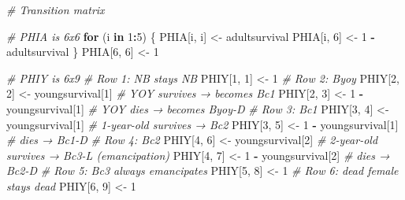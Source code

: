 \documentclass[
  12pt,
]{krantz}
\newenvironment{Shaded}{\begin{snugshade}}{\end{snugshade}}
\newcommand{\CommentTok}[1]{\textcolor[rgb]{0.56,0.35,0.01}{\textit{#1}}}
\newcommand{\ControlFlowTok}[1]{\textcolor[rgb]{0.13,0.29,0.53}{\textbf{#1}}}
\newcommand{\DecValTok}[1]{\textcolor[rgb]{0.00,0.00,0.81}{#1}}
\newcommand{\NormalTok}[1]{#1}
\newcommand{\OtherTok}[1]{\textcolor[rgb]{0.56,0.35,0.01}{#1}}
\newcommand{\SpecialCharTok}[1]{\textcolor[rgb]{0.81,0.36,0.00}{\textbf{#1}}}
\begin{document}
\begin{Shaded}
\begin{Highlighting}[]
\CommentTok{\# Transition matrix}

\CommentTok{\# PHIA is 6x6}
\ControlFlowTok{for}\NormalTok{ (i }\ControlFlowTok{in} \DecValTok{1}\SpecialCharTok{:}\DecValTok{5}\NormalTok{) \{}
\NormalTok{  PHIA[i, i] }\OtherTok{\textless{}{-}}\NormalTok{ adultsurvival}
\NormalTok{  PHIA[i, }\DecValTok{6}\NormalTok{] }\OtherTok{\textless{}{-}} \DecValTok{1} \SpecialCharTok{{-}}\NormalTok{ adultsurvival}
\NormalTok{\}}
\NormalTok{PHIA[}\DecValTok{6}\NormalTok{, }\DecValTok{6}\NormalTok{] }\OtherTok{\textless{}{-}} \DecValTok{1}

\CommentTok{\# PHIY is 6x9}
\CommentTok{\# Row 1: NB stays NB}
\NormalTok{PHIY[}\DecValTok{1}\NormalTok{, }\DecValTok{1}\NormalTok{] }\OtherTok{\textless{}{-}} \DecValTok{1}
\CommentTok{\# Row 2: Byoy}
\NormalTok{PHIY[}\DecValTok{2}\NormalTok{, }\DecValTok{2}\NormalTok{] }\OtherTok{\textless{}{-}}\NormalTok{ youngsurvival[}\DecValTok{1}\NormalTok{]        }\CommentTok{\# YOY survives → becomes Bc1}
\NormalTok{PHIY[}\DecValTok{2}\NormalTok{, }\DecValTok{3}\NormalTok{] }\OtherTok{\textless{}{-}} \DecValTok{1} \SpecialCharTok{{-}}\NormalTok{ youngsurvival[}\DecValTok{1}\NormalTok{]    }\CommentTok{\# YOY dies     → becomes Byoy{-}D}
\CommentTok{\# Row 3: Bc1}
\NormalTok{PHIY[}\DecValTok{3}\NormalTok{, }\DecValTok{4}\NormalTok{] }\OtherTok{\textless{}{-}}\NormalTok{ youngsurvival[}\DecValTok{1}\NormalTok{]        }\CommentTok{\# 1{-}year{-}old survives → Bc2}
\NormalTok{PHIY[}\DecValTok{3}\NormalTok{, }\DecValTok{5}\NormalTok{] }\OtherTok{\textless{}{-}} \DecValTok{1} \SpecialCharTok{{-}}\NormalTok{ youngsurvival[}\DecValTok{1}\NormalTok{]    }\CommentTok{\# dies → Bc1{-}D}
\CommentTok{\# Row 4: Bc2}
\NormalTok{PHIY[}\DecValTok{4}\NormalTok{, }\DecValTok{6}\NormalTok{] }\OtherTok{\textless{}{-}}\NormalTok{ youngsurvival[}\DecValTok{2}\NormalTok{]        }\CommentTok{\# 2{-}year{-}old survives → Bc3{-}L (emancipation)}
\NormalTok{PHIY[}\DecValTok{4}\NormalTok{, }\DecValTok{7}\NormalTok{] }\OtherTok{\textless{}{-}} \DecValTok{1} \SpecialCharTok{{-}}\NormalTok{ youngsurvival[}\DecValTok{2}\NormalTok{]    }\CommentTok{\# dies → Bc2{-}D}
\CommentTok{\# Row 5: Bc3 always emancipates}
\NormalTok{PHIY[}\DecValTok{5}\NormalTok{, }\DecValTok{8}\NormalTok{] }\OtherTok{\textless{}{-}} \DecValTok{1}
\CommentTok{\# Row 6: dead female stays dead}
\NormalTok{PHIY[}\DecValTok{6}\NormalTok{, }\DecValTok{9}\NormalTok{] }\OtherTok{\textless{}{-}} \DecValTok{1}


\end{Highlighting}
\end{Shaded}
\end{document}
